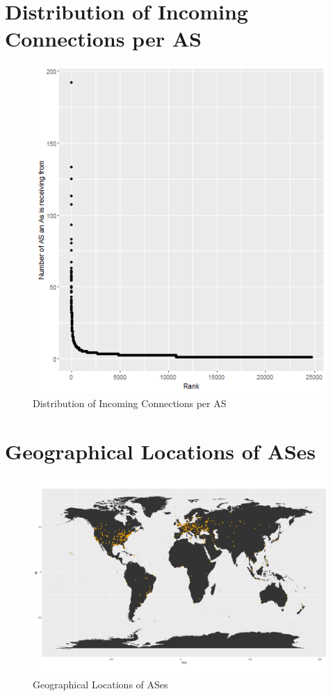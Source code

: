 \documentclass[conference, 11pt]{IEEEtran}
\begin{document}
\begin{appendices}


\section{Distribution of Incoming Connections per AS}

\begin{figure}[htbp]
\centerline{\includegraphics[scale=0.4]{Graphics/AsToDistribution.png}}
\caption{Distribution of Incoming Connections per AS}
\label{fig}
\end{figure}



\section{Geographical Locations of ASes}

\begin{figure}[htbp]
\centerline{\includegraphics[scale=0.2]{Graphics/ASesNurPunkte.png}}
\caption{Geographical Locations of ASes}
\label{fig}
\end{figure}




\end{appendices}
\end{document}
